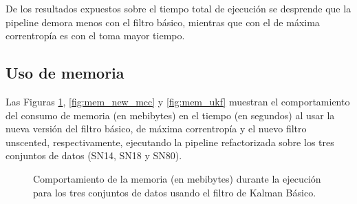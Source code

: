 De los resultados expuestos sobre el tiempo total de ejecuci\'on se desprende que la pipeline demora menos con el filtro b\'asico, mientras que con el de m\'axima correntrop\'ia es con el toma mayor tiempo.

\subsection{Uso de memoria}
Las Figuras \ref{fig:mem_new_kbf}, \ref{fig:mem_new_mcc} y \ref{fig:mem_ukf} muestran el comportamiento del consumo de memoria (en mebibytes) en el tiempo (en segundos) al usar la nueva versi\'on del filtro b\'asico, de m\'axima correntrop\'ia y el nuevo filtro unscented, respectivamente, ejecutando la pipeline refactorizada sobre los tres conjuntos de datos (SN14, SN18 y SN80). 
\bigskip

\begin{figure}[h!]
\centering
{}\hfill
{}\vfill
{}
\caption{Comportamiento de la memoria (en mebibytes) durante la ejecuci\'on para los tres conjuntos de datos usando el filtro de Kalman B\'asico.}
\label{fig:mem_new_kbf}
\end{figure}

